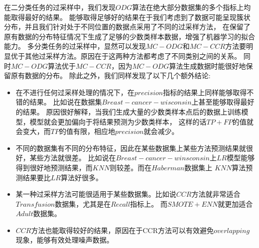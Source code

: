 \documentclass{article}
\begin{document}
在二分类任务的过采样中，我们发现$ODG$算法在绝大部分数据集的多个指标上均能取得最好的结果。
能够取得足够好的结果在于我们考虑到了数据可能呈现簇状分布，并且我们针对处于不同位置的数据点采用了不同的过采样方法，
在保留了原有数据的分布特征情况下生成了足够的少数类样本数据，增强了机器学习的拟合能力。
多分类任务的过采样中，显然可以发现$MC-ODG$和$MC-CCR$方法要明显优于其他过采样方法。原因在于这两种方法都考虑了不同类别之间的关系。
同时$MC-ODG$算法优于$MC-CCR$，因为$MC-ODG$算法生成数据时能很好地保留原有数据的分布。
除此之外，我们同样发现了以下几个额外结论:
\begin{itemize}
  \item 在不进行任何过采样处理的情况下，在$precision$指标的结果上同样能够取得不错的结果。
  比如说在数据集$Breast-cancer-wisconsin$上甚至能够取得最好的结果。
  原因很好解释，当我们生成大量的少数类样本点后的数据上训练模型，模型就会更加偏向于将结果预测为少数类样本，
  这样的话$TP+FP$的值就会变大，而$TP$的值有限，相应地$precision$就会减少。
  \item 不同的数据集有不同的分布特征，因此在某些数据集上某些方法预测结果就很好，某些方法就很差。
  比如说在$Breast-cancer-winsconsin$上$LR$模型能够得到很好地预测结果，而$KNN$则较差。而在$Haberman$数据集上
  $KNN$算法预测结果要比$LR$算法好很多。
  \item 某一种过采样方法可能很适用于某些数据集。比如说$CCR$方法就非常适合$Transfusion$数据集，尤其是在$Recall$指标上。
  而$SMOTE+ENN$就更加适合$Adult$数据集。
  \item $CCR$方法也能取得较好的结果，原因在于CCR方法可以有效避免$overlapping$现象，能够有效处理噪声数据。
\end{itemize}

\end{document}
